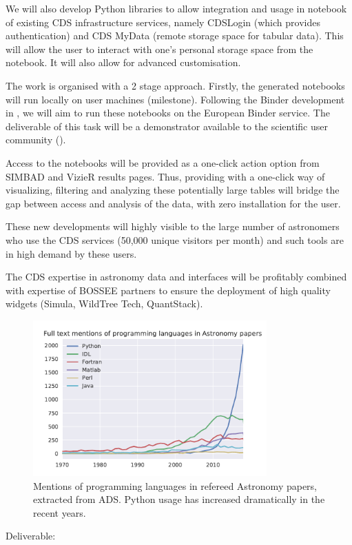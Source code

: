 \begin{task}[
  title=Astronomy application,
  id=astro,
  lead=CDS,
  PM=18,
  wphases={0-48},
  partners={CDS,QS,WTT,SRL}
]
  We will also develop Python libraries to allow integration and usage in
  notebook of existing CDS infrastructure services, namely CDSLogin (which
  provides authentication) and CDS MyData (remote storage space for tabular
  data).
  This will allow the user to interact with one's personal storage space from
  the notebook. It will also allow for advanced customisation.

  The work is organised with a 2 stage approach. Firstly, the generated 
  notebooks will run locally on user machines (milestone). Following the 
  Binder development in , we will aim to run these notebooks 
  on the European Binder service. The deliverable of this task will be a 
  demonstrator available to the scientific user community 
  ().


  Access to the notebooks will be provided as a one-click action option from
  SIMBAD and VizieR results pages.
  Thus, providing with a one-click way of visualizing, filtering and analyzing
these potentially large tables will bridge the gap between access and analysis
of the data, with zero installation for the user.

  These new developments will highly visible to the large number of astronomers who use the CDS services (50,000 unique visitors per month) and such tools are in high demand by these users.

  The CDS expertise in astronomy data and interfaces will be profitably combined with expertise of BOSSEE partners to ensure the deployment of high quality widgets (Simula, WildTree Tech, QuantStack).

  \begin{figure}[ht]\centering
  \includegraphics[width=0.8\textwidth]{python-astro-citations}
  \caption{Mentions of programming languages in refereed Astronomy papers, extracted from ADS. Python usage has increased dramatically in the recent years.}\label{fig:python-astro-citations}
\end{figure}

Deliverable: 


\end{task}
